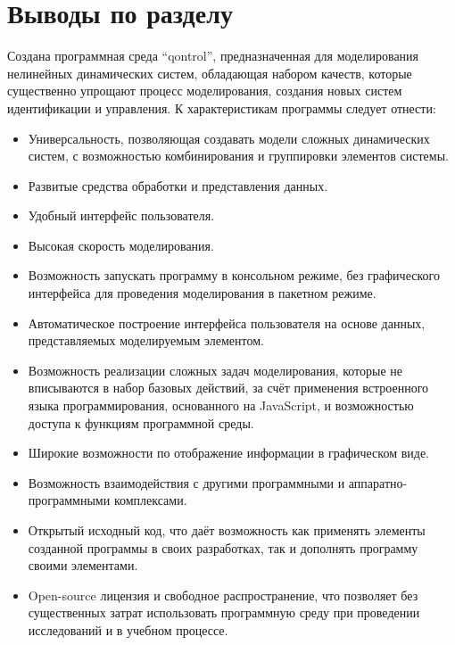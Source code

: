 
\section{Выводы по разделу \thechapter} %

Создана программная среда ``qontrol'', предназначенная для моделирования
нелинейных динамических систем, обладающая набором качеств,
которые существенно упрощают процесс моделирования,
создания новых систем идентификации и управления.
К характеристикам программы следует отнести:

\begin{itemize}

  \item
    Универсальность, позволяющая создавать модели сложных динамических систем,
    с возможностью комбинирования и группировки элементов системы.

  \item
    Развитые средства обработки и представления данных.

  \item
    Удобный интерфейс пользователя.

  \item
    Высокая скорость моделирования.

  \item
    Возможность запускать программу в консольном режиме, без графического интерфейса
    для проведения моделирования в пакетном режиме.

  \item
    Автоматическое построение интерфейса пользователя на основе
    данных, представляемых моделируемым элементом.

  \item
    Возможность реализации сложных задач моделирования, которые не вписываются
    в набор базовых действий, за счёт применения встроенного языка программирования,
    основанного на JavaScript, и возможностью доступа к функциям программной среды.

  \item
    Широкие возможности по отображение информации в графическом виде.

  \item
    Возможность взаимодействия с другими программными и аппаратно-программными
    комплексами.


  \item
    Открытый исходный код, что даёт возможность как применять элементы созданной
    программы в своих разработках, так и дополнять программу своими элементами.


  \item
    Open-source лицензия и свободное распространение,
    что позволяет без существенных затрат использовать программную среду
    при проведении исследований и в учебном процессе.

\end{itemize}




